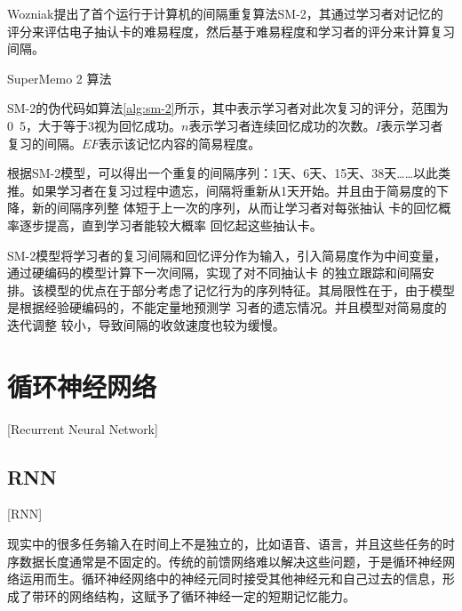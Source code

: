 Wozniak提出了首个运行于计算机的间隔重复算法SM-2\cite{wozniakOptimizationLearning1990}，其通过学习者对记忆的评分来评估电子抽认卡的难易程度，然后基于难易程度和学习者的评分来计算复习间隔。

\begin{algorithm}[htbp]
\caption{SuperMemo 2 算法}
\label{alg:sm-2}
\end{algorithm}

SM-2的伪代码如算法\ref{alg:sm-2}所示，其中表示学习者对此次复习的评分，范围为0~5，大于等于3视为回忆成功。$n$表示学习者连续回忆成功的次数。$I$表示学习者复习的间隔。$EF$表示该记忆内容的简易程度。

根据SM-2模型，可以得出一个重复的间隔序列：1天、6天、15天、38天……以此类推。如果学习者在复习过程中遗忘，间隔将重新从1天开始。并且由于简易度的下降，新的间隔序列整 体短于上一次的序列，从而让学习者对每张抽认 卡的回忆概率逐步提高，直到学习者能较大概率 回忆起这些抽认卡。

SM-2模型将学习者的复习间隔和回忆评分作为输入，引入简易度作为中间变量，通过硬编码的模型计算下一次间隔，实现了对不同抽认卡 的独立跟踪和间隔安排。该模型的优点在于部分考虑了记忆行为的序列特征。其局限性在于，由于模型是根据经验硬编码的，不能定量地预测学 习者的遗忘情况。并且模型对简易度的迭代调整 较小，导致间隔的收敛速度也较为缓慢。

\section{循环神经网络}[Recurrent Neural Network]

\subsection{RNN}[RNN]

现实中的很多任务输入在时间上不是独立的，比如语音、语言，并且这些任务的时序数据长度通常是不固定的。传统的前馈网络难以解决这些问题，于是循环神经网络运用而生。循环神经网络中的神经元同时接受其他神经元和自己过去的信息，形成了带环的网络结构，这赋予了循环神经一定的短期记忆能力。

